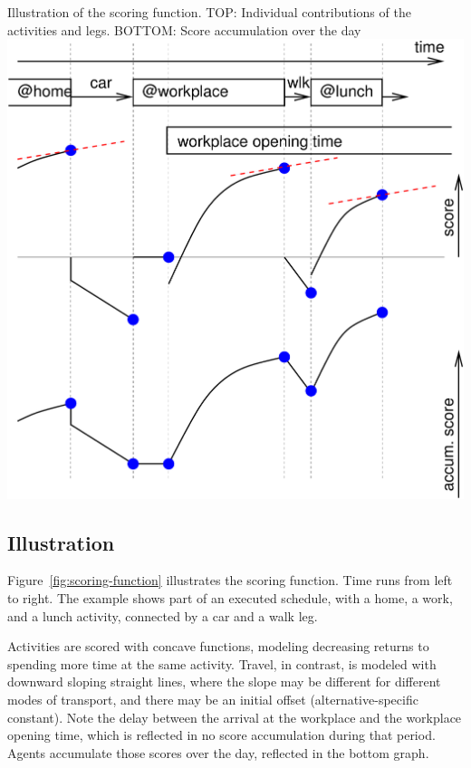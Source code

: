 


%
{Illustration of the scoring function. TOP: Individual contributions of the activities and legs.  BOTTOM: Score accumulation over the day}%
{\label{fig:scoring-function}}%
{\includegraphics[width=0.8\hsize,trim=0 0 0 0,clip]{using/figures/scoring-example}}%
{}

\subsection{Illustration}
\label{sec:utl-fct-illustration}
Figure~\ref{fig:scoring-function} illustrates the scoring function.  Time runs from left to right.  The example shows part of an executed schedule, with a home, a work, and a lunch activity, connected by a car and a walk leg.

Activities are scored with concave functions, modeling decreasing returns to spending more time at the same activity.  Travel, in contrast, is modeled with downward sloping straight lines, where the slope may be different for different modes of transport, and there may be an initial offset (alternative-specific constant).  Note the delay between the arrival at the workplace and the workplace opening time, which is reflected in no score accumulation during that period.  Agents accumulate those scores over the day, reflected in the bottom graph.

